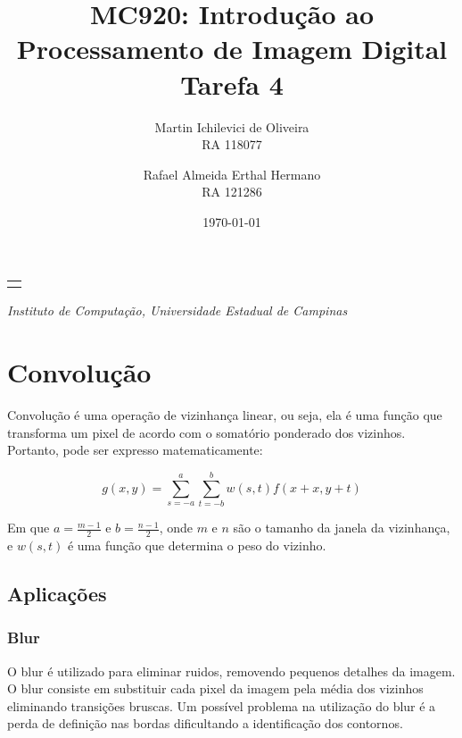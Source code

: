 \documentclass[10pt,a4paper]{article}
\makeatletter
\let\@institution\empty
\def\institution#1{\def\@institution{#1}}
\renewcommand{\maketitle}{
    \begin{center}
        {\Large\bfseries\@title\par\medskip}
        {\large
            \begin{tabular}[t]{c}%
                \@author
        \end{tabular}\par\medskip}
        {\itshape\@institution\par}
        {\itshape\@date\par}
\end{center}}
\makeatother
\begin{document}

\title{MC920: Introdução ao Processamento de Imagem Digital\\Tarefa 4}
\author{
    \begin{minipage}{6cm}
        \centering
        Martin Ichilevici de Oliveira\\
        RA 118077
    \end{minipage}
    \and
    \begin{minipage}{6cm}
        \centering
        Rafael Almeida Erthal Hermano\\
        RA 121286
    \end{minipage}
}
\institution{Instituto de Computação, Universidade Estadual de Campinas}
\date{\today}

\maketitle


\section{Convolução}
Convolução é uma operação de vizinhança linear, ou seja, ela é uma função que transforma um pixel de acordo com o somatório ponderado dos vizinhos.
Portanto, pode ser expresso matematicamente:

\begin{equation}
    g(x,y) = \sum_{s = -a}^{a}\sum_{t = -b}^{b}w(s,t) f(x + x, y + t)
    \label{eq:conv_eq}
\end{equation}

Em que $a = \frac{m-1}{2}$ e $b = \frac{n-1}{2}$, onde $m$ e $n$ são o tamanho da janela da vizinhança, e $w(s,t)$ é uma função que determina o peso do vizinho.

\subsection{Aplicações}
\subsubsection{Blur}
O blur é utilizado para eliminar ruidos, removendo pequenos detalhes da imagem. O blur consiste em substituir cada pixel da imagem pela média dos vizinhos eliminando transições bruscas. Um possível problema na utilização do blur é a perda de definição nas bordas dificultando a identificação dos contornos.
\end{document}
